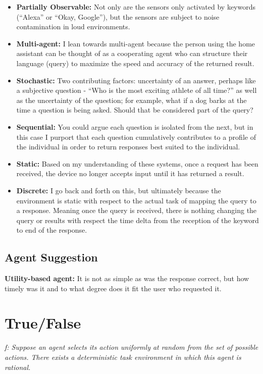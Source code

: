 \documentclass[journal]{IEEEtran}
\begin{document}
\begin{itemize}
\item \textbf{Partially Observable:} Not only are the sensors only 
activated by keywords (``Alexa'' or ``Okay, Google''), but the 
sensors are subject to noise contamination in loud environments.
\item \textbf{Multi-agent:} I lean towards multi-agent because the 
person using the home assistant can be thought of as a cooperating 
agent who can structure their language (query) to maximize the speed 
and accuracy of the returned result.
\item \textbf{Stochastic:} Two contributing factors: uncertainty of 
an answer, perhaps like a subjective question - ``Who is the most 
exciting athlete of all time?'' as well as the uncertainty of the 
question; for example, what if a dog barks at the time a question 
is being asked. Should that be considered part of the query?
\item \textbf{Sequential:} You could argue each question is isolated 
from the next, but in this case I purport that each question cumulatively 
contributes to a profile of the individual in order to return responses 
best suited to the individual.
\item \textbf{Static:} Based on my understanding of these systems, 
once a request has been received, the device no longer accepts input 
until it has returned a result. 
\item \textbf{Discrete:} I go back and forth on this, but ultimately 
because the environment is static with respect to the actual task of 
mapping the query to a response. Meaning once the query is received, 
there is nothing changing the query or results with respect the time 
delta from the reception of the keyword to end of the response.
\end{itemize}

\subsection{Agent Suggestion}

\noindent \textbf{Utility-based agent:} It is not as simple as was the 
response correct, but how timely was it and to what degree does it fit 
the user who requested it.


\section{True/False}

\noindent \textit{f: Suppose an agent selects its action uniformly at 
random from the set of possible actions. There exists a deterministic 
task environment in which this agent is rational.} \\
\end{document}

